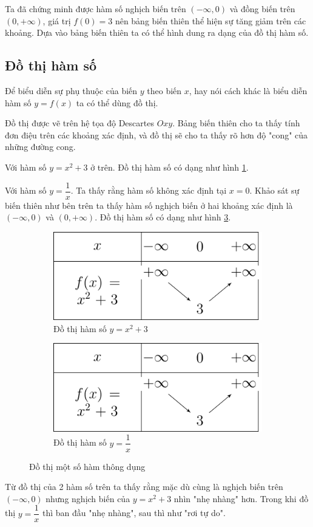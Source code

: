 Ta đã chứng minh được hàm số nghịch biến trên $(-\infty, 0)$ và đồng biến trên $(0, +\infty)$, giá trị $f(0) = 3$ nên bảng biến thiên thể hiện sự tăng giảm trên các khoảng. Dựa vào bảng biến thiên ta có thể hình dung ra dạng của đồ thị hàm số.

\subsection*{Đồ thị hàm số}

Để biểu diễn sự phụ thuộc của biến $y$ theo biến $x$, hay nói cách khác là biểu diễn hàm số $y=f(x)$ ta có thể dùng đồ thị.

Đồ thị được vẽ trên hệ tọa độ Descartes $Oxy$. Bảng biến thiên cho ta thấy tính đơn điệu trên các khoảng xác định, và đồ thị sẽ cho ta thấy rõ hơn độ "cong" của những đường cong.

\begin{example}
    Với hàm số $y = x^2 + 3$ ở trên. Đồ thị hàm số có dạng như hình \ref{func1}.

    Với hàm số $y = \dfrac{1}{x}$. Ta thấy rằng hàm số không xác định tại $x=0$. Khảo sát sự biến thiên như bên trên ta thấy hàm số nghịch biến ở hai khoảng xác định là $(-\infty, 0)$ và $(0, +\infty)$. Đồ thị hàm số có dạng như hình \ref{func2}.
\end{example}

\begin{figure}
    \centering
    \begin{subfigure}{0.4\textwidth}
        \includegraphics[page=2]{figures/table_of_variation.pdf}
        \caption{Đồ thị hàm số $y=x^2 + 3$}
        \label{func1}
    \end{subfigure}
    \hfill
    \begin{subfigure}{0.55\textwidth}
        \includegraphics[page=3]{figures/table_of_variation.pdf}
        \caption{Đồ thị hàm số $y = \dfrac{1}{x}$}
        \label{func2}
    \end{subfigure}
    \caption{Đồ thị một số hàm thông dụng}
\end{figure}
Từ đồ thị của 2 hàm số trên ta thấy rằng mặc dù cùng là nghịch biến trên $(-\infty, 0)$ nhưng nghịch biến của $y=x^2+3$ nhìn "nhẹ nhàng" hơn. Trong khi  đồ thị $y = \dfrac{1}{x}$ thì ban đầu "nhẹ nhàng", sau thì như "rơi tự do".

